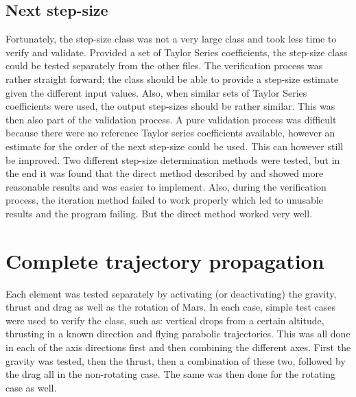 \subsection{Next step-size}
\label{subsec:nextStepSizeverval}
Fortunately, the step-size class was not a very large class and took less time to verify and validate. Provided a set of Taylor Series coefficients, the step-size class could be tested separately from the other files. The verification process was rather straight forward; the class should be able to provide a step-size estimate given the different input values. Also, when similar sets of Taylor Series coefficients were used, the output step-sizes should be rather similar. This was then also part of the validation process. A pure validation process was difficult because there were no reference Taylor series coefficients available, however an estimate for the order of the next step-size could be used. This can however still be improved. Two different step-size determination methods were tested, but in the end it was found that the direct method described by \cite{scott2008high} and \cite{bergsma2015application} showed more reasonable results and was easier to implement. Also, during the verification process, the iteration method failed to work properly which led to unusable results and the program failing. But the direct method worked very well.




\section{Complete trajectory propagation}
\label{sec:propverval}

Each element was tested separately by activating (or deactivating) the gravity, thrust and drag as well as the rotation of Mars. In each case, simple test cases were used to verify the class, such as: vertical drops from a certain altitude, thrusting in a known direction and flying parabolic trajectories. This was all done in each of the axis directions first and then combining the different axes. First the gravity was tested, then the thrust, then a combination of these two, followed by the drag all in the non-rotating case. The same was then done for the rotating case as well. 

%
%


